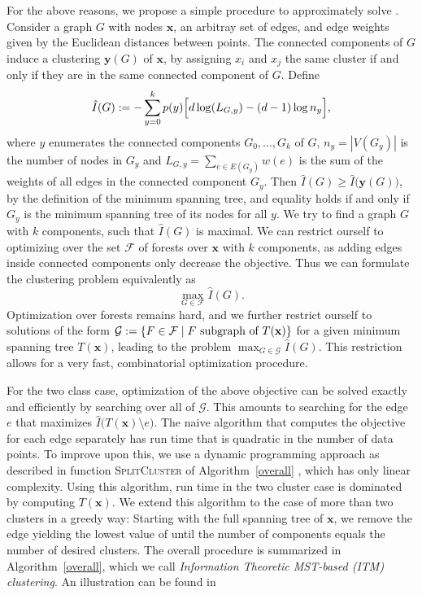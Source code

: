 For the above reasons, we propose a simple procedure to approximately solve
.
Consider a graph $G$ with nodes $\mathbf{x}$, an arbitray set of edges, and edge weights given by the
Euclidean distances between points.  The connected components of $G$ induce a
clustering $\mathbf{y}(G)$ of $\mathbf{x}$, by assigning $x_i$ and $x_j$ the
same cluster if and only if they are in the same connected component of $G$.
Define
\begin{align}\label{eq:graphobjective}
\hat{I}(G) := - \sum_{y=0}^k p(y) \Bigl[ d \log(L_{G,y}) - (d-1) \log{n_y} \Bigr],
\end{align}
where $y$ enumerates the connected components $G_0, \dotsc, G_k$ of $G$, $n_y =
|V(G_y)|$ is the number of nodes in $G_y$ and $L_{G,y} = \sum_{e \in E(G_y)}
w(e)$ is the sum of the weights of all edges in the connected component $G_y$.
%
Then $\hat{I}(G) \geq \hat{I}\bigl(\mathbf{y}(G)\bigr)$, by the definition of
the minimum spanning tree, and equality holds if and only if $G_y$ is the
minimum spanning tree of its nodes for all $y$.
%
We try to find a graph $G$ with $k$ components, such that $\hat{I}(G)$ is maximal. We can restrict
ourself to optimizing over the set $\mathcal{F}$ of forests over $\mathbf{x}$ with $k$ components,
as adding edges inside connected components only decrease the objective.
Thus we can formulate the clustering problem equivalently as
\begin{equation}
    \max_{G \in \mathcal{F}} \hat{I}(G).
\end{equation}
Optimization over forests remains hard, and we further restrict ourself to
solutions of the form $\mathcal{G} := \{ F \in \mathcal{F} \mid F \text{\ subgraph of\
} T(\mathbf{x}) \}$ for a given minimum spanning tree $T(\mathbf{x})$, leading to
the problem $\displaystyle \max_{G \in \mathcal{G}} \hat{I}(G)$.  This restriction allows for
a very fast, combinatorial optimization procedure.


For the two class case, optimization of the above objective can be solved
exactly and efficiently by searching over all of $\mathcal{G}$.
This amounts to searching for the edge $e$ that maximizes $\hat{I}\bigl(T(\mathbf{x})
\setminus e\bigr)$. The naive algorithm that computes the objective for each edge
separately has run time that is quadratic in the number of data points.  To
improve upon this, we use a dynamic programming approach as described in
function \textsc{SplitCluster} of Algorithm~\ref{overall} , which has only linear
complexity. Using this algorithm, run time in the two cluster case is dominated
by computing $T(\mathbf{x})$.
%
We extend this algorithm to the case of more than two clusters in a greedy way:
Starting with the full spanning tree of $\mathbf{x}$, we remove the edge
yielding the lowest value of \Eqref{graphobjective} until the number of
components equals the number of desired clusters. The overall procedure is
summarized in Algorithm~\ref{overall}, which we call \emph{Information
Theoretic MST-based (ITM) clustering}.  An illustration can be found in
\Figref{illustration}

